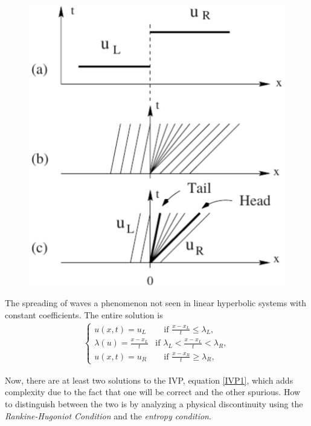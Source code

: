 \documentclass[]{article}
\begin{document}
			\begin{figure}[h] 	
				\centering
				\includegraphics[scale=.55]{RarefactionWave}
				\caption{}
				\label{RarefactionWave}
			\end{figure}
			The spreading of waves a phenomenon not seen in linear hyperbolic systems with constant coefficients. The entire solution is
			\begin{equation}
				\begin{aligned}
				\left\{
					\begin{array}{ll}
						u(x,t) = u_L & \quad \mbox{if } \frac{x - x_L}{t} \leq \lambda_L, \\
						\lambda(u) = \frac{x - x_L}{t} & \mbox{if } \lambda_L < \frac{x - x_L}{t} < \lambda_R, \\
						u(x,t) = u_R & \quad \mbox{if } \frac{x - x_R}{t} \geq \lambda_R,
					\end{array}
				\right.
				\end{aligned}
			\end{equation}
	
			Now, there are at least two solutions to the IVP, equation \ref{IVP1}, which adds complexity due to the fact that one will be correct and the other spurious. How to distinguish between the two is by analyzing a physical discontinuity using the \textit{Rankine-Hugoniot Condition} and the \textit{entropy condition}.
	
\end{document}
